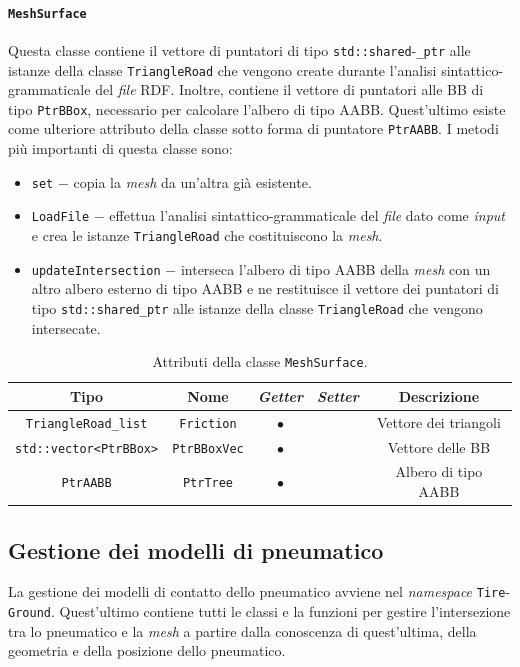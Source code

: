 \paragraph{\texttt{MeshSurface}}
Questa classe contiene il vettore di puntatori di tipo \texttt{std::shared}-\texttt{\_ptr} alle istanze della classe \texttt{TriangleRoad} che vengono create durante l'analisi sintattico-grammaticale del \textit{file} \ac{RDF}. Inoltre, contiene il vettore di puntatori alle \ac{BB} di tipo \texttt{PtrBBox}, necessario per calcolare l'albero di tipo \ac{AABB}. Quest'ultimo esiste come ulteriore attributo della classe sotto forma di puntatore \texttt{PtrAABB}. I metodi più importanti di questa classe sono:
\begin{itemize}
	\item \texttt{set} $-$ copia la \textit{mesh} da un'altra già esistente.
	\item \texttt{LoadFile} $-$ effettua l'analisi sintattico-grammaticale del \textit{file} dato come \textit{input} e crea le istanze \texttt{TriangleRoad} che costituiscono la \textit{mesh}.
	\item \texttt{updateIntersection} $-$ interseca l'albero di tipo \ac{AABB} della \textit{mesh} con un altro albero esterno di tipo \ac{AABB} e ne restituisce il vettore dei puntatori di tipo \texttt{std::shared\_ptr} alle istanze della classe \texttt{TriangleRoad} che vengono intersecate.
\end{itemize}
\begin{table}[h!]
	\centering
	\begin{tabular}{|c|c|c|c|c|}
		\hline 
		\textbf{Tipo} & \textbf{Nome} & \textit{\textbf{Getter}} & \textit{\textbf{Setter}} & \textbf{Descrizione} \\ \hline 
		\texttt{TriangleRoad\_list} & \texttt{Friction} & $\bullet$ & & Vettore dei triangoli \\ \hline
		\texttt{std::vector<PtrBBox>} & \texttt{PtrBBoxVec} & $\bullet$ & & Vettore delle \ac{BB} \\ \hline
		\texttt{PtrAABB} & \texttt{PtrTree} & $\bullet$ & & Albero di tipo \ac{AABB} \\ \hline
	\end{tabular}
	\caption{Attributi della classe \texttt{MeshSurface}.}
\end{table}
%
\subsection{Gestione dei modelli di pneumatico} 
La gestione dei modelli di contatto dello pneumatico avviene nel \textit{namespace} \texttt{Tire}-\texttt{Ground}. Quest'ultimo contiene tutti le classi e la funzioni per gestire l'intersezione tra lo pneumatico e la \textit{mesh} a partire dalla conoscenza di quest'ultima, della geometria e della posizione dello pneumatico.
%
